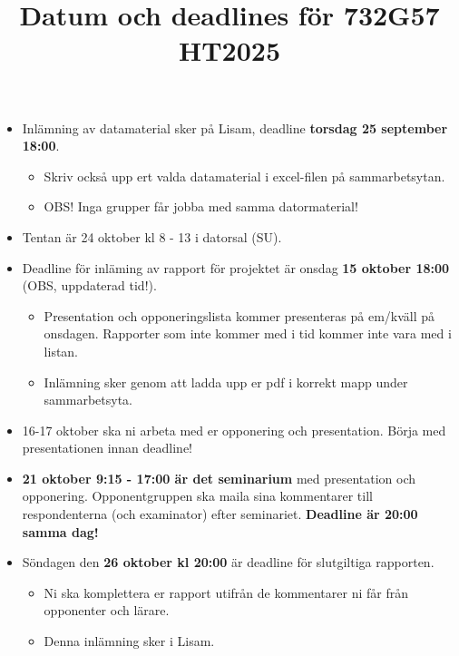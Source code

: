 \documentclass[a4paper]{article}
\title{Datum och deadlines för 732G57 HT2025}
\author{}
\date{}
\begin{document}
\maketitle
\thispagestyle{fancy}

\begin{itemize}
    \item Inlämning av datamaterial sker på Lisam, deadline \textbf{torsdag 25 september 18:00}.
    \begin{itemize}
        \item Skriv också upp ert valda datamaterial i excel-filen på sammarbetsytan.
        \item OBS! Inga grupper får jobba med samma datormaterial!
    \end{itemize}
    \item Tentan är 24 oktober kl 8 - 13 i datorsal (SU).
    \item Deadline för inläming av rapport för projektet är onsdag \textbf{15 oktober 18:00} (OBS, uppdaterad tid!).
    \begin{itemize}
        \item Presentation och opponeringslista kommer presenteras på em/kväll på onsdagen. 
        Rapporter som inte kommer med i tid kommer inte vara med i listan.
        \item Inlämning sker genom att ladda upp er pdf i korrekt mapp under sammarbetsyta.
    \end{itemize}
    \item 16-17 oktober ska ni arbeta med er opponering och presentation. Börja med presentationen
    innan deadline!
    \item \textbf{21 oktober 9:15 - 17:00 är det seminarium} med presentation och opponering.
    Opponentgruppen ska maila sina kommentarer till respondenterna (och examinator) efter 
    seminariet. \textbf{Deadline är 20:00 samma dag!}
    \item Söndagen den \textbf{26 oktober kl 20:00} är deadline för slutgiltiga rapporten.
    \begin{itemize}
        \item Ni ska komplettera er rapport utifrån de kommentarer ni får från opponenter och lärare.
        \item Denna inlämning sker i Lisam.
    \end{itemize}
\end{itemize}
\end{document}
